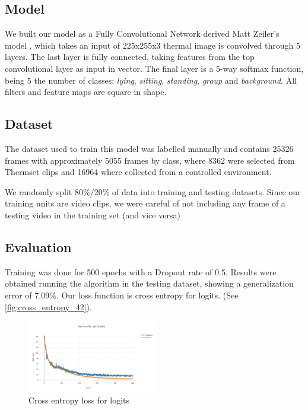 \documentclass[oneside, twocolumn]{article}
\begin{document}
\subsection{Model}

We built our model as a Fully Convolutional Network derived Matt Zeiler's model \cite{zeiler-2014}, which takes
an input of 225x255x3 thermal image is convolved through 5 layers. The last layer is fully connected, taking
features from the top convolutional layer as input in vector. The final layer is a 5-way softmax function, being 5
the number of classes: \textit{lying}, \textit{sitting}, \textit{standing}, \textit{group} and \textit{background}.
All filters and feature maps are square in shape.

\subsection{Dataset}
The dataset used to train this model was labelled manually and contains 25326 frames with approximately 5055 frames
by class, where 8362 were selected from Thermset clips and 16964 where collected from a controlled environment.

We randomly split 80\%/20\% of data into training and testing datasets. Since our training units are video clips,
we were careful of not including any frame of a testing video in the training set (and vice versa)

\subsection{Evaluation}
Training was done for 500 epochs with a Dropout rate of 0.5. Results were obtained running the algorithm in the
testing dataset, showing a generalization error of 7.09\%. Our loss function is cross entropy for logits.
(See \autoref{fig:cross_entropy_42}).

\begin{figure}
  \centering
    \includegraphics[width=0.5\textwidth]{images/loss_42.png}
  \caption{Cross entropy loss for logits}
  \label{fig:cross_entropy_42}
\end{figure}
\end{document}
